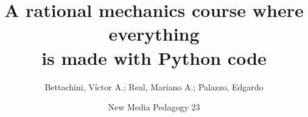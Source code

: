 \documentclass[aspectratio=169]{beamer}
\begin{document}
\title[A code centred mechanics subject]{A rational mechanics course where everything\\is made with Python code}
\author[vbettachini@unlam.edu.ar]{Bettachini, Víctor A.; Real, Mariano A.; Palazzo, Edgardo}
\date[2023-11-23]{
	New Media Pedagogy 23
}


\begin{frame}
  \titlepage
\end{frame}

\end{document}
